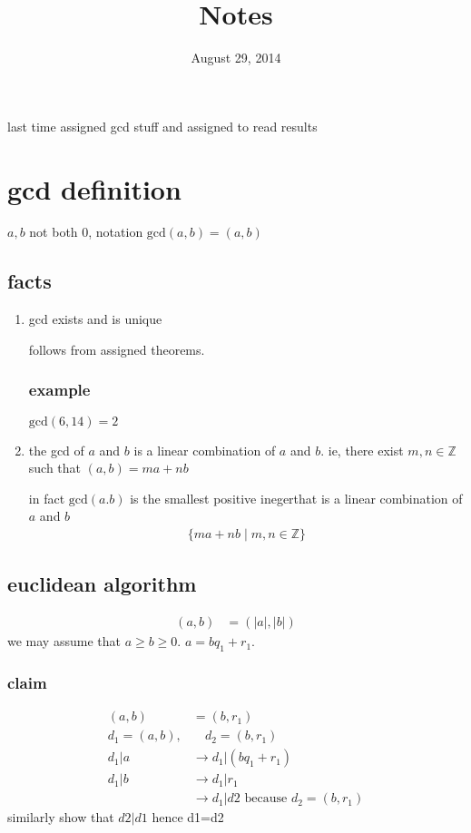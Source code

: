 \documentclass[letterpaper]{article}
\newcommand{\abs}[1]{\left\lvert #1 \right\rvert}
\begin{document}
\title{Notes}
\date{August 29, 2014}
\maketitle

last time assigned gcd stuff and assigned to read results

\section*{gcd definition}
$a,b$ not both 0, notation $\text{gcd}(a,b)=(a,b)$

\subsection*{facts}
\begin{enumerate}
\item
gcd exists and  is unique

follows from assigned theorems.

\subsubsection*{example}
$\text{gcd}(6,14)=2$
\item
the gcd of $a$ and $b$ is a linear combination of $a$ and $b$. ie, there exist $m,n\in\mathbb{Z}$ such that $(a,b)=ma+nb$

in fact $\text{gcd}(a.b)$ is the smallest positive inegerthat is a linear combination of $a$ and $b$
\begin{align*}
  \{ma+nb\mid m,n\in\mathbb{Z}\}
\end{align*}
\end{enumerate}

\subsection*{euclidean algorithm}
\begin{align*}
  (a,b)&=(\abs{a},\abs{b})
\end{align*}
we may assume that $a\ge b\ge 0$. $a=bq_1+r_1$.

\subsubsection*{claim}
\begin{align*}
  (a,b)&=(b,r_1)\\
  d_1=(a,b),&\quad d_2=(b,r_1)\\
  d_1\vert a&\rightarrow d_1\vert(bq_1+r_1)\\
  d_1\vert b&\rightarrow d_1\vert r_1\\
  &\rightarrow d_1\vert d2 \text{ because } d_2=(b,r_1)
\end{align*}
similarly show that $d2\vert d1$ hence d1=d2
\end{document}
